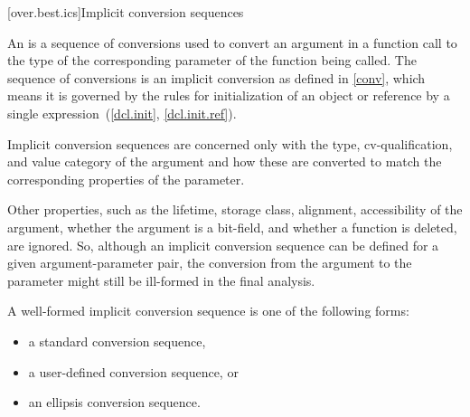 [over.best.ics]{Implicit conversion sequences}%

\pnum
An 
is a sequence of conversions used
to convert an argument in a function call to the type of the
corresponding parameter of the function being called.
The
sequence of conversions is an implicit conversion as defined in
\ref{conv}, which means it is governed by the rules for
initialization of an object or reference by a single
expression~(\ref{dcl.init}, \ref{dcl.init.ref}).

\pnum
Implicit conversion sequences are concerned only with the type,
cv-qualification, and value category of the argument and how these
are converted to match the corresponding properties of the
parameter.
\begin{note}
Other properties, such as the lifetime, storage class,
alignment, accessibility of the argument, whether the argument is a bit-field,
and whether a function is deleted, are ignored.
So, although an implicit
conversion sequence can be defined for a given argument-parameter
pair, the conversion from the argument to the parameter might still
be ill-formed in the final analysis.
\end{note}

\pnum
A
well-formed implicit conversion
sequence is one of the following forms:
\begin{itemize}
\item
a standard conversion sequence,
\item
a user-defined conversion sequence, or
\item
an ellipsis conversion sequence.
\end{itemize}

